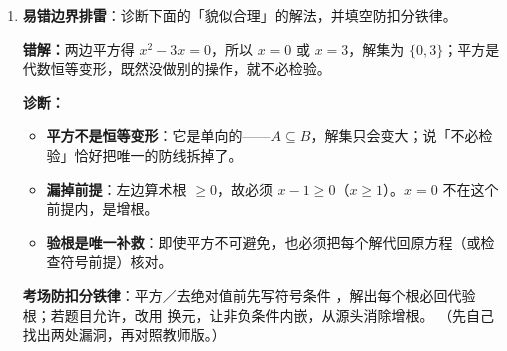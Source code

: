 \begin{tcolorbox}
\begin{enumerate}[label=(\arabic*), itemsep=4pt]
\begin{advancedonly}
反向印证（漏根一侧）：$x^2=ax$ 移项分解为 $x(x-a)=0$，$a\ne0$ 时解集为 $\{0,a\}$；两边同除以 $x$ 得 $x=a$，解集缩小为 $\{a\}$，漏掉了 $x=0$。若 $a=0$，原方程为 $x^2=0$，解集为 $\{0\}$（二重根），同除同样非法。

\begin{center}
\end{center}

动机：平方与同除是方向相反的两类「破坏等价」；表格记住了方向，考场上就不会只算「怎么变」、不算「往哪变」。
\end{advancedonly}

\item \textbf{易错边界排雷}：诊断下面的「貌似合理」的解法，并填空防扣分铁律。

{\bfseries\color{red!70!black}错解：}两边平方得 $x^2-3x=0$，所以 $x=0$ 或 $x=3$，解集为 $\{0,3\}$；平方是代数恒等变形，既然没做别的操作，就不必检验。

\ifteacher
{\bfseries\color{main}诊断：}
\begin{itemize}[itemsep=1pt]
\item \textbf{平方不是恒等变形}：它是单向的——$A\subseteq B$，解集只会变大；说「不必检验」恰好把唯一的防线拆掉了。
\item \textbf{漏掉前提}：左边算术根 $\ge0$，故必须 $x-1\ge0$（$x\ge1$）。$x=0$ 不在这个前提内，是增根。
\item \textbf{验根是唯一补救}：即使平方不可避免，也必须把每个解代回原方程（或检查符号前提）核对。
\end{itemize}

\textbf{考场防扣分铁律}：平方／去绝对值前先写符号条件 ，解出每个根必回代验根；若题目允许，改用  换元，让非负条件内嵌，从源头消除增根。
\else
{\small（先自己找出两处漏洞，再对照教师版。）}
\fi
\end{enumerate}
\end{tcolorbox}


